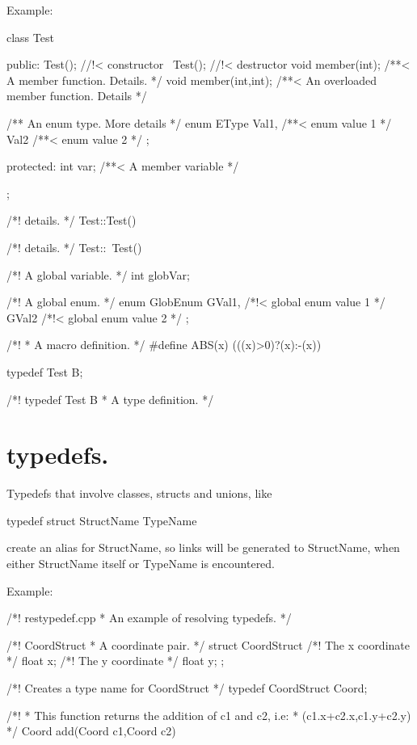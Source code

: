 \begin{DoxyParagraph}{Example:}
\begin{DoxyVerbInclude}
class Test
{
  public:
    Test();               //!< constructor 
   ~Test();               //!< destructor 
    void member(int);     /**< A member function. Details. */
    void member(int,int); /**< An overloaded member function. Details */

    /** An enum type. More details */
    enum EType { 
      Val1,               /**< enum value 1 */ 
      Val2                /**< enum value 2 */ 
    };                

  protected:
    int var;              /**< A member variable */
};

/*! details. */
Test::Test() { }

/*! details. */
Test::~Test() { }

/*! A global variable. */
int globVar;

/*! A global enum. */
enum GlobEnum { 
                GVal1,    /*!< global enum value 1 */ 
                GVal2     /*!< global enum value 2 */ 
              };

/*!
 *  A macro definition.
 */ 
#define ABS(x) (((x)>0)?(x):-(x))

typedef Test B;

/*! \fn typedef Test B
 *  A type definition. 
 */
\end{DoxyVerbInclude}
 
\end{DoxyParagraph}
\hypertarget{autolink_resolving}{}\section{typedefs.}\label{autolink_resolving}
Typedefs that involve classes, structs and unions, like \begin{DoxyVerb}
typedef struct StructName TypeName
\end{DoxyVerb}
 create an alias for StructName, so links will be generated to StructName, when either StructName itself or TypeName is encountered.

\begin{DoxyParagraph}{Example:}

\begin{DoxyVerbInclude}
/*! \file restypedef.cpp
 * An example of resolving typedefs.
 */

/*! \struct CoordStruct
 * A coordinate pair.
 */
struct CoordStruct
{
  /*! The x coordinate */
  float x;
  /*! The y coordinate */
  float y;
};

/*! Creates a type name for CoordStruct */ 
typedef CoordStruct Coord;

/*! 
 * This function returns the addition of \a c1 and \a c2, i.e:
 * (c1.x+c2.x,c1.y+c2.y)
 */
Coord add(Coord c1,Coord c2)
{
}
\end{DoxyVerbInclude}
  
\end{DoxyParagraph}
